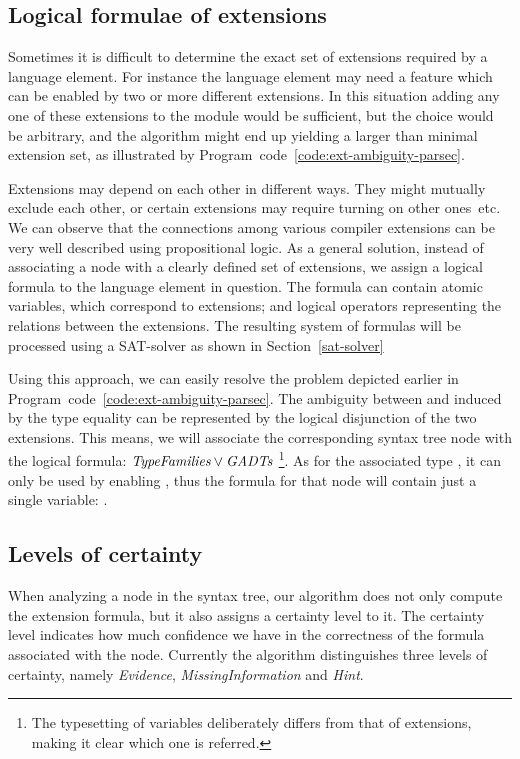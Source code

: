 \documentclass[main.tex]{subfiles}
\begin{document}
	\subsection{Logical formulae of extensions}
	
	Sometimes it is difficult to determine the exact set of extensions required by a language element. For instance the language element may need a feature which can be enabled by two or more different extensions. In this situation adding any one of these extensions to the module would be sufficient, but the choice would be arbitrary, and the algorithm might end up yielding a larger than minimal extension set, as illustrated by Program~code~\ref{code:ext-ambiguity-parsec}.
	
	Extensions may depend on each other in different ways. They might mutually exclude each other, or certain extensions may require turning on other ones~etc.	We can observe that the connections among various compiler extensions can be very well described using propositional logic. As a general solution, instead of associating a node with a clearly defined set of extensions, we assign a logical formula to the language element in question. The formula can contain atomic variables, which correspond to extensions; and logical operators representing the relations between the extensions. The resulting system of formulas will be processed using a SAT-solver as shown in Section~\ref{sat-solver}
	
	Using this approach, we can easily resolve the problem depicted earlier in Program~code~\ref{code:ext-ambiguity-parsec}. The ambiguity between  and  induced by the type equality can be represented by the logical disjunction of the two extensions. This means, we will associate the corresponding syntax tree node with the logical formula: $\textit{TypeFamilies} \lor \textit{GADTs}$ \footnote{The typesetting of variables deliberately differs from that of extensions, making it clear which one is referred.}. As for the associated type , it can only be used by enabling , thus the formula for that node will contain just a single variable: .
	
	\subsection{Levels of certainty} \label{certainty-levels}
	
	When analyzing a node in the syntax tree, our algorithm does not only compute the extension formula, but it also assigns a certainty level to it. The certainty level indicates how much confidence we have in the correctness of the formula associated with the node. Currently the algorithm distinguishes three levels of certainty, namely \emph{Evidence}, \emph{MissingInformation} and \emph{Hint}. 
	
\end{document}
